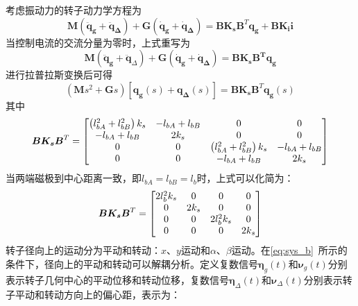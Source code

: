 \documentclass[
  lang=cn,
  degree=master,
  openany,oneside
]{nuaathesis}
\begin{document}
考虑振动力的转子动力学方程为
\begin{equation}
\boldsymbol{M} \left( { \boldsymbol{{\ddot q}_g} + \boldsymbol{{{\ddot q}}_\Delta } } \right) + \boldsymbol{G}\left( { \boldsymbol{{\dot q}_{g}} + \boldsymbol{{{\dot q}}_\Delta } } \right) = \boldsymbol{B} \boldsymbol{K_s} {{\boldsymbol{B}}^{T}} \boldsymbol{{q}_g} + \boldsymbol{B} \boldsymbol{{K}_{i}} \boldsymbol{i}
\end{equation}
当控制电流的交流分量为零时，上式重写为
\begin{equation}
\boldsymbol{M}\left( {\boldsymbol{{\ddot q}_g} + {\boldsymbol{{\ddot q}}_\Delta }} \right) + \boldsymbol{G}\left( {\boldsymbol{{\dot q}_{g}} + \boldsymbol{{{\dot q}}_\Delta }} \right) = \boldsymbol{B}\boldsymbol{K_s}\boldsymbol{{B}^{T}}\boldsymbol{{q}_g}
\end{equation}
进行拉普拉斯变换后可得
\begin{equation}
\left( {\boldsymbol{M}{s^2} + \boldsymbol{G}s} \right)\left[ {\boldsymbol{q_g}\left( s \right) + \boldsymbol{q_\Delta }\left( s \right)} \right] =  \boldsymbol{B}\boldsymbol{{K}_{s}}{{\boldsymbol{B}}^{T}}\boldsymbol{{q}_g}\left( s \right)
\end{equation}
其中
\begin{equation}
\boldsymbol{B}\boldsymbol{K_s}{{\boldsymbol{B}}^{T}} = \left[ {\begin{matrix}
   \left({ l_{bA}^2 + l_{bB}^2} \right)k_s & { - {l_{bA}} + {l_{bB}}} & 0 & 0  \cr 
   { - {l_{bA}} + {l_{bB}}} & 2k_s & 0 & 0  \cr 
   0 & 0 & \left({ l_{bA}^2 + l_{bB}^2} \right)k_s & { - {l_{bA}} + {l_{bB}}}  \cr 
   0 & 0 & { - {l_{bA}} + {l_{bB}}} & 2k_s  \cr 
 \end{matrix} } \right]
\end{equation}
当两端磁极到中心距离一致，即${l_{bA}} = {l_{bB}} = {l_b}$时，上式可以化简为：
\begin{equation}
\label{eq:sys_b}
\boldsymbol{B}\boldsymbol{K_s}{{\boldsymbol{B}}^{T}} = \left[ {\begin{matrix}
   {2l_b^2k_s} & 0 & 0 & 0  \cr 
   0 & 2k_s & 0 & 0  \cr 
   0 & 0 & {2l_b^2k_s} & 0  \cr 
   0 & 0 & 0 & 2k_s  \cr 

 \end{matrix} } \right]
\end{equation}
转子径向上的运动分为平动和转动：$x$、$y$运动和$\alpha$、$\beta$运动。在\autoref{eq:sys_b}~所示的条件下，径向上的平动和转动可以解耦分析。定义复数信号$\boldsymbol{\eta} _g(t)$和$\boldsymbol{\nu} _g(t)$分别表示转子几何中心的平动位移和转动位移，复数信号$\boldsymbol{\eta} _{\Delta}(t)$和$\boldsymbol{\nu} _{\Delta}(t)$分别表示转子平动和转动方向上的偏心距，表示为：
\end{document}
